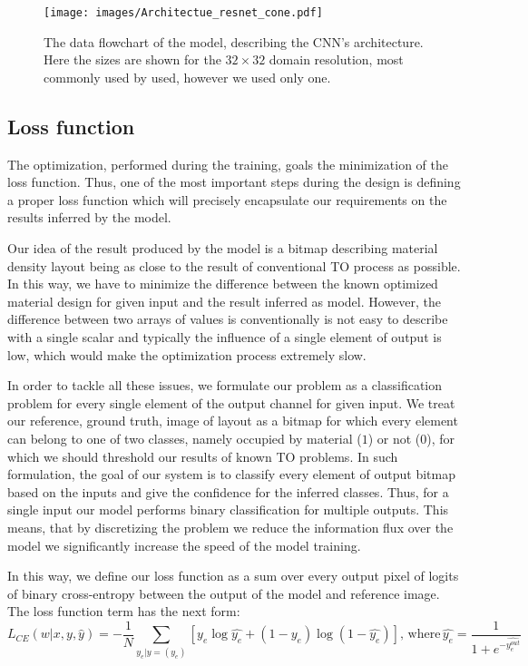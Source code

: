 \begin{figure}
	\centering
	\texttt{[image: images/Architectue\_resnet\_cone.pdf]}
	\label{fig:arch_1}
	\caption{The data flowchart of the model, describing the CNN's architecture. Here the sizes are shown for the $32 \times 32$ domain resolution, most commonly used by used, however we used only one.}
\end{figure}


\subsection{Loss function}

The optimization, performed during the training, goals the minimization of the loss function.
Thus, one of the most important steps during the design is defining a proper loss function which will precisely encapsulate our requirements on the results inferred by the model.
\medskip

Our idea of the result produced by the model is a bitmap describing material density layout being as close to the result of conventional TO process as possible.
In this way, we have to minimize the difference between the known optimized material design for given input and the result inferred as model.
However, the difference between two arrays of values is conventionally is not easy to describe with a single scalar and typically the influence of a single element of output is low, which would make the optimization process extremely slow.
\medskip

In order to tackle all these issues, we formulate our problem as a classification problem for every single element of the output channel for given input. 
We treat our reference, ground truth, image of layout as a bitmap for which every element can belong to one of two classes, namely occupied by material ($1$)  or not ($0$), for which we should threshold our results of known TO problems.
In such formulation, the goal of our system is to classify every element of output bitmap based on the inputs and give the confidence for the inferred classes.
Thus, for a single input our model performs binary classification for multiple outputs.
This means, that by discretizing the problem we reduce the information flux over the model we significantly increase the speed of the model training.
\medskip

In this way, we define our loss function as a sum over every output pixel of logits of binary cross-entropy between the output of the model and reference image.
The loss function term has the next form:
\begin{equation}
 L_{CE}(w|x, y, \hat{y}) = -\frac{1}{N} \sum_{y_{e}|y=(y_{e})}^{} [ y_{e} \log \hat{y_{e}} + (1-y_{e}) \log (1-\hat{y_{e}})] , \, \mathrm{where} \, \hat{y_{e}} = \frac{1}{1+e^{-\hat{y_{e}^{out}}}}
\end{equation}
\medskip

